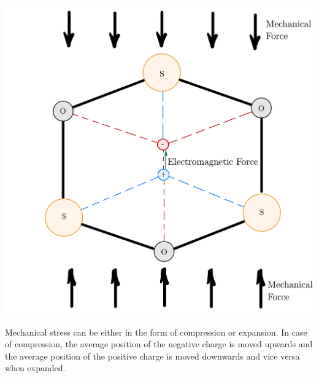 \begin{minipage}{0.33\textwidth}
    \includegraphics[width=\textwidth]{./Figure_3.jpg}
    \label{fig:Quartzcell compressed}
\end{minipage}
\begin{minipage}{0.66\textwidth}
Mechanical stress can be either in the form of compression or expansion. In case of compression, the average position of the negative charge is moved upwards and the average position of the positive charge is moved downwards and vice versa when expanded.\\
\end{minipage}

\vspace{0.5cm}

